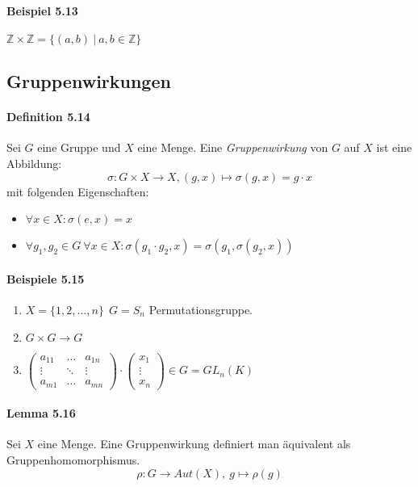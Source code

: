 \documentclass{scrartcl}
\begin{document}
\paragraph{Beispiel 5.13}  $\mathbb{Z} \times \mathbb{Z} = \{ (a, b) ~|~ a,b \in
\mathbb{Z}\}$

\subsection{Gruppenwirkungen}
\label{subsec:gruppenwirkungen}

\paragraph{Definition 5.14} Sei $G$ eine Gruppe und $X$ eine Menge. Eine
\textit{Gruppenwirkung} von $G$ auf $X$ ist eine Abbildung:
\[
  \sigma: G \times X \to X, (g, x) \mapsto \sigma(g, x) = g \cdot x
\]
mit folgenden Eigenschaften:
\begin{itemize}
\item $\forall x \in X: \sigma(e, x) = x$
\item $\forall g_1,g_2 \in G~\forall x \in X: \sigma(g_1 \cdot g_2, x) =
  \sigma(g_1, \sigma(g_2, x))$
\end{itemize}

\paragraph{Beispiele 5.15}
\begin{enumerate}
\item $X = \{1, 2, \dots, n\} ~~ G = S_n $ Permutationsgruppe.
\item $G \times G \to G$
\item $
  \begin{pmatrix}
    a_{11} & \dots & a_{1n} \\
    \vdots & \ddots & \vdots \\
    a_{m1} & \dots & a_{mn}
  \end{pmatrix} \cdot
  \begin{pmatrix}
    x_1 \\
    \vdots \\
    x_n
  \end{pmatrix} \in G = GL_n(K)$
\end{enumerate}

\paragraph{Lemma 5.16} Sei $X$ eine Menge. Eine Gruppenwirkung definiert man
äquivalent als Gruppenhomomorphismus.
\[
  \rho: G \to Aut(X),~ g \mapsto \rho(g)
\]
\end{document}
